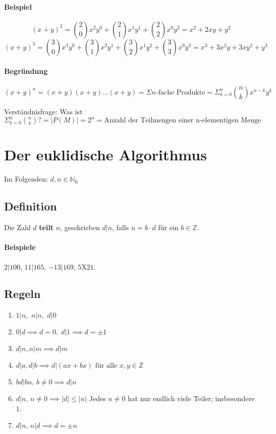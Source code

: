 \documentclass[14pt,a4paper]{article}
\begin{document}
   		   \paragraph{Beispiel}
   			   $$ (x + y)^2 = \binom{2}{0} x^2 y^0 + \binom{2}{1} x^1 y^1 + \binom{2}{2} x^0 y^2 = x^2 + 2xy + y^2 $$
   			   $$ (x + y)^3 = \binom{3}{0} x^3 y^0 + \binom{3}{1} x^2 y^1 + \binom{3}{2} x^1 y^2 + \binom{3}{3} x^0 y^3 = x^3 + 3x^2y+3xy^2+y^3 $$

   		   \paragraph{Begründung}
   			   $$ (x+y)^n = (x+y)(x+y)\dots(x+y) = \Sigma n\text{-fache Produkte} = \Sigma_{k=0}^n \binom{n}{k} x^{n-k}y^k $$

   		   Verständnisfrage: Was ist $ \Sigma_{k=0}^n \binom{n}{k} \text{?} = |P(M)| = 2^n =  \text{Anzahl der Teilmengen einer n-elementigen Menge} $

      \section{Der euklidische Algorithmus}
   	   Im Folgenden: $ d,n \in \mathbb{N}_0 $
   	   \subsection{Definition}
   		   Die Zahl $d$ \textbf{teilt} $n$, geschrieben $d|n$, falls $n = b \cdot d$ für ein $b \in \mathbb{Z}$.
   	   \paragraph{Beispiele}
   		   $ 2 | 100 $, $ 11|165$, $-13|169$, $5 \text{X}21$.
   	   \subsection{Regeln}
   		   \begin{enumerate}
   			   \item $1|n,\,\,n|n,\,\,d|0$
   			   \item $0|d \implies d=0,\;d|1 \implies d = \pm 1$
   			   \item $d|n, n|m \implies d|m$
   			   \item $d|a, d|b \implies d|(ax + bx) \text{ für alle } x,y \in \mathbb{Z}$
   			   \item $bd | bn,\, b \neq 0 \implies d|n$
   			   \item $d|n, \, n \neq 0 \implies |d| \leq |n|$\,\,Jedes $n \neq 0$ hat nur endlich viele Teiler; insbesondere $1$.
   			   \item $d|n,\,n|d \implies d = \pm n$
   		   \end{enumerate}
\end{document}
